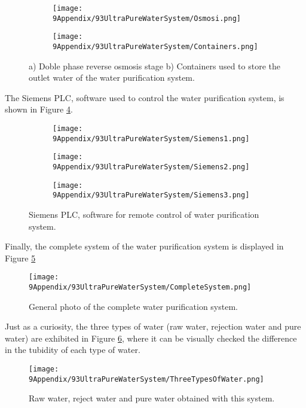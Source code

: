 \begin{figure}
\centering
    \begin{subfigure}[b]{0.3\textwidth}
    \centering
    \texttt{[image: 9Appendix/93UltraPureWaterSystem/Osmosi.png]}  
    \caption{\label{subfig:Osmosi}}
    \end{subfigure}
    \hfill
    \begin{subfigure}[b]{0.5\textwidth}
    \centering
    \texttt{[image: 9Appendix/93UltraPureWaterSystem/Containers.png]}  
    \caption{\label{subfig:Containers}}
    \end{subfigure}
 \caption{a) Doble phase reverse osmosis stage b) Containers used to store the outlet water of the water purification system.}
 \label{subfig:OsmosisContainers}
\end{figure}

The Siemens PLC, software used to control the water purification system, is shown in Figure \ref{fig:Siemens}.

\begin{figure}
\centering
    \begin{subfigure}[b]{0.37\textwidth}
    \centering
    \texttt{[image: 9Appendix/93UltraPureWaterSystem/Siemens1.png]}  
    \caption{}
    \end{subfigure}
    \hfill
    \begin{subfigure}[b]{0.3\textwidth}
    \centering
    \texttt{[image: 9Appendix/93UltraPureWaterSystem/Siemens2.png]}  
    \caption{}
    \end{subfigure}
    \hfill
    \begin{subfigure}[b]{0.27\textwidth}
    \centering
    \texttt{[image: 9Appendix/93UltraPureWaterSystem/Siemens3.png]}  
    \caption{}
    \end{subfigure}
 \caption{Siemens PLC, software for remote control of water purification system.}
 \label{fig:Siemens}
\end{figure}

Finally, the complete system of the water purification system is displayed in Figure \ref{fig:CompleteSystem}

\begin{figure}[htbp]
\centering
\texttt{[image: 9Appendix/93UltraPureWaterSystem/CompleteSystem.png]}
\caption{General photo of the complete water purification system.\label{fig:CompleteSystem}}
\end{figure}

Just as a curiosity, the three types of water (raw water, rejection water and pure water) are exhibited in Figure \ref{fig:ThreeTypesOfWater}, where it can be visually checked the difference in the tubidity of each type of water.

\begin{figure}[htbp]
\centering
\texttt{[image: 9Appendix/93UltraPureWaterSystem/ThreeTypesOfWater.png]}
\caption{Raw water, reject water and pure water obtained with this system.\label{fig:ThreeTypesOfWater}}
\end{figure}

